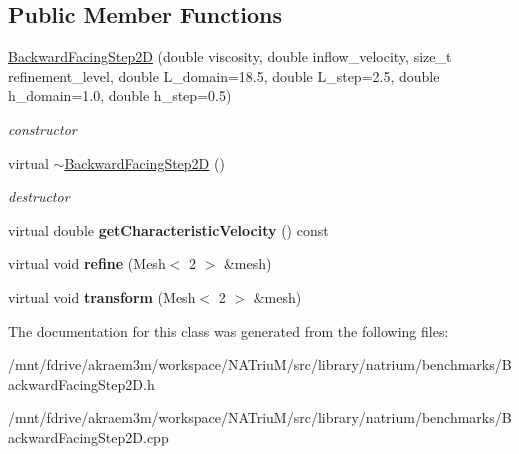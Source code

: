 \subsection*{Public Member Functions}
\begin{DoxyCompactItemize}
\item 
\hypertarget{classnatrium_1_1BackwardFacingStep2D_acee242cbe42db517032d784ea9667755}{
\hyperlink{classnatrium_1_1BackwardFacingStep2D_acee242cbe42db517032d784ea9667755}{BackwardFacingStep2D} (double viscosity, double inflow\_\-velocity, size\_\-t refinement\_\-level, double L\_\-domain=18.5, double L\_\-step=2.5, double h\_\-domain=1.0, double h\_\-step=0.5)}
\label{classnatrium_1_1BackwardFacingStep2D_acee242cbe42db517032d784ea9667755}

\begin{DoxyCompactList}\small\item\em constructor \item\end{DoxyCompactList}\item 
\hypertarget{classnatrium_1_1BackwardFacingStep2D_a5eba90130e3ba07642ac092617f81f9d}{
virtual \hyperlink{classnatrium_1_1BackwardFacingStep2D_a5eba90130e3ba07642ac092617f81f9d}{$\sim$BackwardFacingStep2D} ()}
\label{classnatrium_1_1BackwardFacingStep2D_a5eba90130e3ba07642ac092617f81f9d}

\begin{DoxyCompactList}\small\item\em destructor \item\end{DoxyCompactList}\item 
\hypertarget{classnatrium_1_1BackwardFacingStep2D_a6f8e1c7c911c7f15c503530352075218}{
virtual double {\bfseries getCharacteristicVelocity} () const }
\label{classnatrium_1_1BackwardFacingStep2D_a6f8e1c7c911c7f15c503530352075218}

\item 
\hypertarget{classnatrium_1_1BackwardFacingStep2D_a9f1629d0fd14226b3b8360752e62dba2}{
virtual void {\bfseries refine} (Mesh$<$ 2 $>$ \&mesh)}
\label{classnatrium_1_1BackwardFacingStep2D_a9f1629d0fd14226b3b8360752e62dba2}

\item 
\hypertarget{classnatrium_1_1BackwardFacingStep2D_abc272e3f4e2bc5a5fd5aa56c67fe354a}{
virtual void {\bfseries transform} (Mesh$<$ 2 $>$ \&mesh)}
\label{classnatrium_1_1BackwardFacingStep2D_abc272e3f4e2bc5a5fd5aa56c67fe354a}

\end{DoxyCompactItemize}


The documentation for this class was generated from the following files:\begin{DoxyCompactItemize}
\item 
/mnt/fdrive/akraem3m/workspace/NATriuM/src/library/natrium/benchmarks/BackwardFacingStep2D.h\item 
/mnt/fdrive/akraem3m/workspace/NATriuM/src/library/natrium/benchmarks/BackwardFacingStep2D.cpp\end{DoxyCompactItemize}
